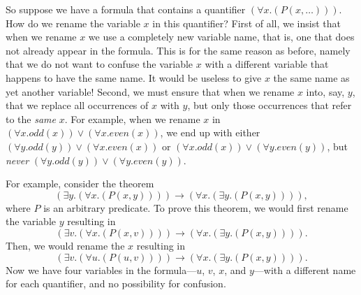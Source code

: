 {{So suppose we have a formula that contains a quantifier $(\forall x.(P(x, \dots)))$. How do we rename the variable $x$ in 
this quantifier? First of all, we insist that when we rename $x$ we use a completely new variable name, that is, one that does
not already appear in the formula. This is for the same reason as before, namely that we do not want to confuse the variable
$x$ with a different variable that happens to have the same name. It would be useless to give $x$ the same name as yet another
variable! Second, we must ensure that when we rename $x$ into, say, $y$, that we replace all occurrences of $x$ with $y$, but
only those occurrences that refer to the \emph{same} $x$. For example, when we rename $x$ in 
$(\forall x.odd(x)) \vee (\forall x.even(x))$, we end up with either
$(\forall y.odd(y)) \vee (\forall x.even(x))$ or
$(\forall x.odd(x)) \vee (\forall y.even(y))$, but \emph{never}
$(\forall y.odd(y)) \vee (\forall y.even(y))$.

For example, consider the theorem 
$$(\exists y. (\forall x. (P(x, y)))) \rightarrow (\forall x. (\exists y. (P(x, y)))),$$
where $P$ is an arbitrary predicate. To prove this theorem, we would first rename the variable $y$ resulting in
$$(\exists v. (\forall x. (P(x, v)))) \rightarrow (\forall x. (\exists y. (P(x, y)))).$$
Then, we would rename the $x$ resulting in
$$(\exists v. (\forall u. (P(u, v)))) \rightarrow (\forall x. (\exists y. (P(x, y)))).$$
Now we have four variables in the formula---$u$, $v$, $x$, and $y$---with a different name for each quantifier, and no
possibility for confusion.

}}
